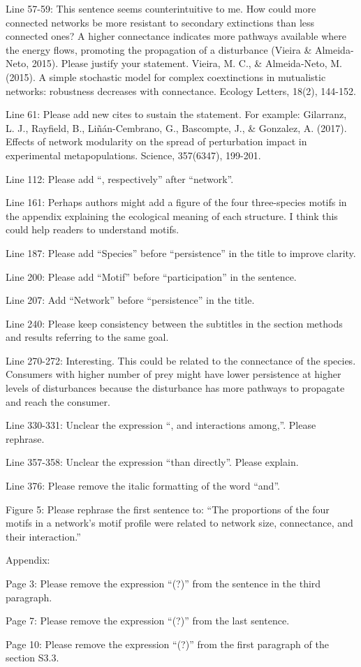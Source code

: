 \documentclass[12pt]{article}
\begin{document}
Line 57-59: This sentence seems counterintuitive to me. How could more connected networks be more resistant to secondary extinctions than less connected ones? A higher connectance indicates more pathways available where the energy flows, promoting the propagation of a disturbance (Vieira & Almeida-Neto, 2015). Please justify your statement.
Vieira, M. C., & Almeida‐Neto, M. (2015). A simple stochastic model for complex coextinctions in mutualistic networks: robustness decreases with connectance. Ecology Letters, 18(2), 144-152.

Line 61: Please add new cites to sustain the statement. For example:
Gilarranz, L. J., Rayfield, B., Liñán-Cembrano, G., Bascompte, J., & Gonzalez, A. (2017). Effects of network modularity on the spread of perturbation impact in experimental metapopulations. Science, 357(6347), 199-201.

Line 112: Please add “, respectively” after “network”.

Line 161: Perhaps authors might add a figure of the four three-species motifs in the appendix explaining the ecological meaning of each structure. I think this could help readers to understand motifs.

Line 187: Please add “Species” before “persistence” in the title to improve clarity.

Line 200: Please add “Motif” before “participation” in the sentence.

Line 207: Add “Network” before “persistence” in the title.

Line 240: Please keep consistency between the subtitles in the section methods and results referring to the same goal.

Line 270-272: Interesting. This could be related to the connectance of the species. Consumers with higher number of prey might have lower persistence at higher levels of disturbances because the disturbance has more pathways to propagate and reach the consumer.

Line 330-331: Unclear the expression “, and interactions among,”. Please rephrase.

Line 357-358: Unclear the expression “than directly”. Please explain.

Line 376: Please remove the italic formatting of the word “and”.

Figure 5: Please rephrase the first sentence to: “The proportions of the four motifs in a network's motif profile were related to network size, connectance, and their interaction.”

Appendix:

Page 3: Please remove the expression “(?)” from the sentence in the third paragraph.

Page 7: Please remove the expression “(?)” from the last sentence.

Page 10: Please remove the expression “(?)” from the first paragraph of the section S3.3.
\end{document}
